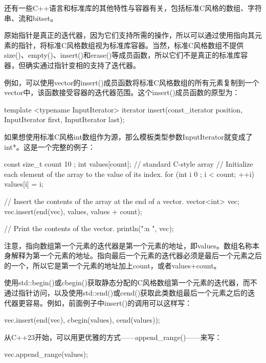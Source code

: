 
还有一些C++语言和标准库的其他特性与容器有关，包括标准C风格的数组、字符串、流和bitset。


原始指针是真正的迭代器，因为它们支持所需的操作，所以可以通过使用指向其元素的指针，将标准C风格数组视为标准库容器。当然，标准C风格数组不提供size()、empty()、insert()和erase()等成员函数，所以它们不是真正的标准库容器，但确实通过指针变相的支持了迭代器。

例如，可以使用vector的insert()成员函数将标准C风格数组的所有元素复制到一个vector中，该函数接受容器的迭代器范围。这个insert()成员函数的原型为：

\begin{cpp}
template <typename InputIterator> iterator insert(const_iterator position,
    InputIterator first, InputIterator last);
\end{cpp}

如果想使用标准C风格int数组作为源，那么模板类型参数InputIterator就变成了int*。这是一个完整的例子：

\begin{cpp}
const size_t count { 10 };
int values[count]; // standard C-style array
// Initialize each element of the array to the value of its index.
for (int i { 0 }; i < count; ++i) { values[i] = i; }

// Insert the contents of the array at the end of a vector.
vector<int> vec;
vec.insert(end(vec), values, values + count);

// Print the contents of the vector.
println("{:n} ", vec);
\end{cpp}

注意，指向数组第一个元素的迭代器是第一个元素的地址，即values。数组名称本身解释为第一个元素的地址。指向最后一个元素的迭代器必须是最后一个元素之后的一个，所以它是第一个元素的地址加上count，或者values+count。

使用std::begin()或cbegin()获取静态分配的C风格数组第一个元素的迭代器，而不通过指针访问，以及使用std::end()或cend()获取此类数组最后一个元素之后的迭代器更容易。例如，前面例子中insert()的调用可以这样写：

\begin{cpp}
vec.insert(end(vec), cbegin(values), cend(values));
\end{cpp}

从C++23开始，可以用更优雅的方式——append\_range()——来写：

\begin{cpp}
vec.append_range(values);
\end{cpp}


